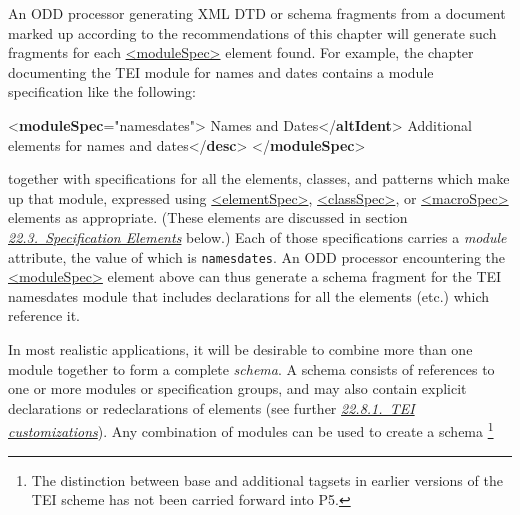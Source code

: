 An ODD processor generating XML DTD or schema fragments from a document marked up according to the recommendations of this chapter will generate such fragments for each \hyperref[TEI.moduleSpec]{<moduleSpec>} element found. For example, the chapter documenting the TEI module for names and dates contains a module specification like the following: \par\bgroup{}\exampleFont \begin{shaded}\noindent\mbox{}{<\textbf{moduleSpec}\hspace*{1em}{ident}="{namesdates}">}\mbox{}\newline 
{}Names and Dates{</\textbf{altIdent}>}\mbox{}\newline 
{}Additional elements for names and dates{</\textbf{desc}>}\mbox{}\newline 
{</\textbf{moduleSpec}>}\end{shaded}\egroup\par \noindent  together with specifications for all the elements, classes, and patterns which make up that module, expressed using \hyperref[TEI.elementSpec]{<elementSpec>}, \hyperref[TEI.classSpec]{<classSpec>}, or \hyperref[TEI.macroSpec]{<macroSpec>} elements as appropriate. (These elements are discussed in section \textit{\hyperref[TDcrystals]{22.3.\ Specification Elements}} below.) Each of those specifications carries a {\itshape module} attribute, the value of which is \texttt{namesdates}. An ODD processor encountering the \hyperref[TEI.moduleSpec]{<moduleSpec>} element above can thus generate a schema fragment for the TEI \textsf{namesdates} module that includes declarations for all the elements (etc.) which reference it.\par
In most realistic applications, it will be desirable to combine more than one module together to form a complete \textit{schema}. A schema consists of references to one or more modules or specification groups, and may also contain explicit declarations or redeclarations of elements (see further \textit{\hyperref[TDbuild]{22.8.1.\ TEI customizations}}). Any combination of modules can be used to create a schema \footnote{The distinction between base and additional tagsets in earlier versions of the TEI scheme has not been carried forward into P5.}\par
